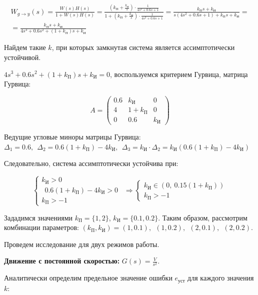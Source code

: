 \begin{par}
$$\begin{array}{l}
W_{g\to y} (s)=\frac{W(s)H(s)}{1+W(s)H(s)}=\frac{\left(k_П +\frac{k_И }{s}\right)\cdot \frac{1}{4s^2 +0.6s+1}}{1+\left(k_П +\frac{k_И }{s}\right)\cdot \frac{1}{4s^2 +0.6s+1}}=\frac{k_П s+k_И }{s(4s^2 +0.6s+1)+k_П s+k_И }=\\
=\frac{k_П s+k_И }{4s^3 +0.6s^2 +(1+k_П )s+k_И }
\end{array}$$
\end{par}


Найдем такие $k$, при которых замкнутая система является ассимптотически устойчивой.


$4s^3 +0.6s^2 +(1+k_П )s+k_И =0$, воспользуемся критерием Гурвица, матрица Гурвица:

\begin{par}
$$A=\left(\begin{array}{ccc}
0.6 & k_И  & 0\\
4 & 1+k_П  & 0\\
0 & 0.6 & k_И 
\end{array}\right)$$
\end{par}


Ведущие угловые миноры матрицы Гурвица: $\Delta_1 =0.6,~~\Delta_2 =0.6(1+k_П )-4k_И ,~~\Delta_3 =k_И \cdot \Delta_2 =k_И (0.6(1+k_П )-4k_И )$


Следовательно, система ассимптотически устойчива при:

\begin{par}
$$\left\lbrace \begin{array}{c}
k_И >0\\
~~0.6(1+k_П )-4k_И >0\\
k_П >-1
\end{array}\right.~~\Rightarrow \left\lbrace \begin{array}{c}
k_И \in \left(0,~0.15(1+k_П )\right)\\
k_П >-1
\end{array}\right.$$
\end{par}


Зададимся значениями $k_П =\lbrace 1,2\rbrace$, $k_И =\lbrace 0.1,0.2\rbrace$. Таким образом, рассмотрим комбинации параметров: $(k_П ,k_И )=(1,0.1),~~(1,0.2),~~(2,0.1),~~(2,0.2)$.


Проведем исследование для двух режимов работы.


\textbf{Движение с постоянной скоростью: }$G(s)=\frac{V}{s^2 }$.


Аналитически определим предельное значение ошибки $e_{уст}$ для каждого значения $k$:


